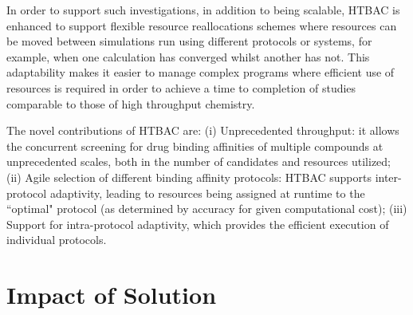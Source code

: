 \documentclass[conference]{IEEEtran}
\begin{document}
In order to support such
investigations, in addition to being scalable, HTBAC is enhanced to
support flexible resource reallocations schemes where resources can be moved
between simulations run using different protocols or systems, for example,
when one calculation has converged whilst another has not. This adaptability
makes it easier to manage complex programs where efficient use of resources
is required in order to achieve a time to completion of studies comparable to
those of high throughput chemistry. 

The novel contributions of HTBAC are: (i) Unprecedented throughput: it allows
the concurrent screening for drug binding affinities of multiple compounds at
unprecedented scales, both in the number of candidates and resources utilized;
(ii) Agile selection of different binding affinity protocols: HTBAC supports
inter-protocol adaptivity, leading to resources being assigned at runtime to
the ``optimal" protocol (as determined by accuracy for given computational
cost); (iii) Support for intra-protocol adaptivity, which provides the
efficient execution of individual protocols. 




       
\section{Impact of Solution}\label{sec:impact}
\end{document}
